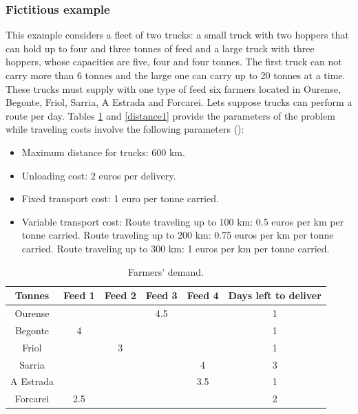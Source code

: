 \subsubsection{Fictitious example}

This example considers a fleet of two trucks: a small truck with two hoppers that can hold up to four and three tonnes of feed and a large truck with three hoppers, whose capacities are five, four and four tonnes. The first truck can not carry more than 6 tonnes and the large one can carry up to 20 tonnes at a time. These trucks must supply with one type of feed six farmers located in Ourense, Begonte, Friol, Sarria, A Estrada and Forcarei. Lets suppose trucks can perform a route per day. Tables \ref{demand1} and \ref{distance1} provide the parameters of the problem while traveling costs involve the following parameters (\cite{Balbina}):
\begin{itemize}
\item Maximum distance for trucks: 600 km.
\item Unloading cost: 2 euros per delivery.
\item Fixed transport cost: 1 euro per tonne carried.
\item Variable transport cost: 
\subitem Route traveling up to 100 km: 0.5 euros per km per tonne carried.
\subitem Route traveling up to 200 km: 0.75 euros per km per tonne carried.
\subitem Route traveling up to 300 km: 1 euros per km per tonne carried.
\end{itemize}

\begin{table}[H]
\centering
\begin{tabular}{c| c c c c c}
	\hline 
	Tonnes  	& Feed 1 & Feed 2   & Feed 3   &  Feed 4  &  Days left to deliver \\
	\hline 
	Ourense    	& & & 4.5 & & 1   \\
	Begonte  	& 4 & & & & 1    \\
	Friol    	& & 3 & & & 1    \\
	Sarria  	& & & & 4 & 3    \\
	A Estrada 	& & & & 3.5&  1  \\
	Forcarei	& 2.5 & & & &  2 \\
	\hline 
\end{tabular}

\caption{Farmers' demand.}
\label{demand1}
\end{table}\

